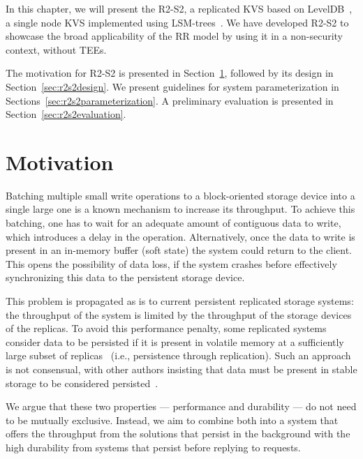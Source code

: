 \label{chap:storage}
\cleardoublepage{}

In this chapter, we will present the \acf{R2-S2}, a replicated
\ac{KVS} based on LevelDB~\cite{leveldb}, a single node \ac{KVS}
implemented using  \acp{LSM-tree}~\cite{lsm}. We have developed
\ac{R2-S2} to showcase the broad applicability of the \ac{RR}
model by using it in a non-security context, without \acp{TEE}.

The motivation for \ac{R2-S2} is presented in
Section~\ref{sec:r2s2motivation}, followed by its design in
Section~\ref{sec:r2s2design}. We present guidelines for system
parameterization in Sections~\ref{sec:r2s2parameterization}.
A preliminary evaluation is presented in Section~\ref{sec:r2s2evaluation}.

\section{Motivation}\label{sec:r2s2motivation}
Batching multiple small write operations to a block-oriented storage device into a
single large one is a known mechanism to increase its throughput.
To achieve this batching, one has to wait for an adequate amount
of contiguous data to write, which introduces a delay in the
operation. Alternatively, once the data to write is present in
an in-memory buffer (soft state) the system could return to the
client. This opens the possibility of data loss, if the system
crashes before effectively synchronizing this data to the persistent
storage device.

%
This problem is propagated as is to current persistent replicated storage
systems: the throughput of the system is limited by the
throughput of the storage devices of the replicas. To avoid this
performance penalty, some replicated systems consider data to be persisted if it is
present in volatile memory at a sufficiently large subset of replicas~\cite{pbft}
(i.e., persistence through replication). Such an approach is not
consensual, with other authors insisting that data must be
present in stable storage to be considered
persisted~\cite{bolosky:paxos}.

We argue that these two properties --- performance and
durability --- do not need to be mutually exclusive. Instead, we
aim to combine both into a system that offers the throughput from
the solutions that persist in the background with the high
durability from systems that persist before replying to
requests.

